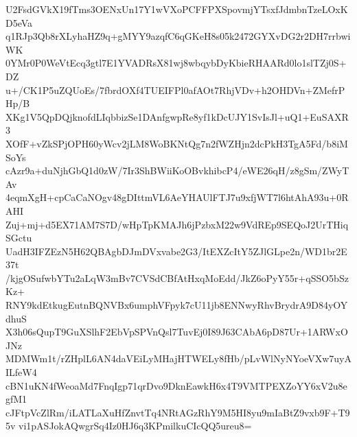 U2FsdGVkX19fTms3OENxUn17Y1wVXoPCFFPXSpovmjYTsxfJdmbnTzeLOxKD5eVa
q1RJp3Qb8rXLyhaHZ9q+gMYY9azqfC6qGKeH8s05k2472GYXvDG2r2DH7rrbwiWK
0YMr0P0WeVtEcq3gtl7E1YVADRsX81wj8wbqybDyKbieRHAARd0lo1slTZj0S+DZ
u+/CK1P5uZQUoEs/7fbrdOXf4TUEIFPl0afAOt7RhjVDv+h2OHDVn+ZMefrPHp/B
XKg1V5QpDQjknofdLIqbbizSe1DAnfgwpRe8yf1kDcUJY1SvIsJl+uQ1+EuSAXR3
XOfF+vZkSPjOPH60yWcv2jLM8WoBKNtQg7n2fWZHjn2dcPkH3TgA5Fd/b8iMSoYs
cAzr9a+duNjhGbQ1d0zW/7Ir3ShBWiiKoOBvkhibcP4/eWE26qH/z8gSm/ZWyTAv
4eqmXgH+cpCaCaNOgv48gDIttmVL6AeYHAUlFTJ7u9xfjWT7l6htAhA93u+0RAHI
Zuj+mj+d5EX71AM7S7D/wHpTpKMAJh6jPzbxM22w9VdREp9SEQoJ2UrTHiqSGctu
UadH3IFZEzN5H62QBAgbDJmDVxvabe2G3/ItEXZcItY5ZJlGLpe2n/WD1br2E37t
/kjgOSufwbYTu2aLqW3mBv7CVSdCBfAtHxqMoEdd/JkZ6oPyY55r+qSSO5bSzKz+
RNY9kdEtkugEutnBQNVBx6umphVFpyk7cU11jb8ENNwyRhvBrydrA9D84yOYdhuS
X3h06sQupT9GuXSlhF2EbVpSPVnQsl7TuvEj0I89J63CAbA6pD87Ur+1ARWxOJNz
MDMWm1t/rZHplL6AN4daVEiLyMHajHTWELy8fHb/pLvWlNyNYoeVXw7uyAILfeW4
cBN1uKN4fWeoaMd7FnqIgp71qrDvo9DknEawkH6x4T9VMTPEXZoYY6xV2u8egfM1
cJFtpVcZlRm/iLATLaXuHfZnvtTq4NRtAGzRhY9M5HI8yu9mIaBtZ9vxb9F+T95v
vi1pASJokAQwgrSq4Iz0HJ6q3KPmilkuCIcQQ5ureu8=
